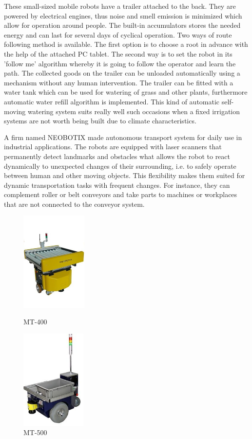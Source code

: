 \documentclass[12pt,english]{article}
\begin{document}
\noindent These small-sized mobile robots have a trailer attached to the back. They are powered by electrical engines, thus noise and smell emission is minimized which allow for operation around people. The built-in accumulators stores the needed energy and can last for several days of cyclical operation. Two ways of route following method is available. The first option is to choose a root in advance with the help of the attached PC tablet. The second way is to set the robot in its 'follow me' algorithm whereby it is going to follow the operator and learn the path. The collected goods on the trailer can be unloaded automatically using a mechanism without any human intervention. The trailer can be fitted with a water tank which can be used for watering of grass and other plants, furthermore automatic water refill algorithm is implemented. This kind of automatic self-moving watering system suits really well such occasions when a fixed irrigation systems are not worth being built due to climate characteristics.\cite{smp}

A firm named NEOBOTIX made autonomous transport system for daily use in industrial applications. The robots are equipped with laser scanners that permanently detect landmarks and obstacles what allows the robot to react dynamically to unexpected changes of their surrounding, i.e. to safely operate between human and other moving objects. This flexibility makes them suited for dynamic transportation tasks with frequent changes. For instance, they can complement roller or belt conveyors and take parts to machines or workplaces that are not connected to the conveyor system. \cite{neo}

\begin{figure}[htb!]
	\centering
	\centering
	\includegraphics[height=5cm]{figures/neo1.jpg}
	\caption{{\small MT-400}}
	\endminipage\hfill
	\centering
	\includegraphics[height=5cm]{figures/neo2.jpg}
	\caption{{\small MT-500}}
	\label{conv2}
	\endminipage\hfill
\end{figure} 
\end{document}
